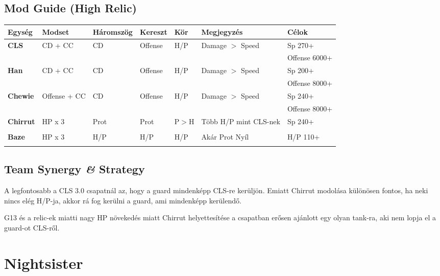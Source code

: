 \documentclass[11pt]{report}
\begin{document}
\section{Mod Guide (High Relic)}
\begin{center}
    \begin{tabular}{|l | l | l | l | l | l | l |}
        \hline
        Egység & Modset & Háromszög & Kereszt & Kör & Megjegyzés & Célok\\ \hline
        \textbf{CLS} & CD + CC & CD & Offense & H/P & Damage $>$ Speed & Sp 270+\\
        &  &  &  &  &  & Offense 6000+\\ \hline
        \textbf{Han} & CD + CC & CD & Offense & H/P & Damage $>$ Speed & Sp 200+\\
        &  &  &  &  &  & Offense 8000+\\ \hline
        \textbf{Chewie} & Offense + CC & CD & Offense & H/P & Damage $>$ Speed & Sp 240+\\ 
        &  &  &  &  &  & Offense 8000+\\ \hline
        \textbf{Chirrut} & HP x 3 & Prot & Prot & P$>$H & Több H/P mint CLS-nek & Sp 240+\\
        &  &  &  &  &  & \\ \hline
        \textbf{Baze} & HP x 3 & H/P & H/P & H/P & Akár Prot Nyíl & H/P 110+\\
        &  &  &  &  &  & \\ \hline
    \end{tabular}
\end{center}
\section{Team Synergy \textit{\&} Strategy}
A legfontosabb a CLS 3.0 csapatnál az, hogy a guard mindenképp CLS-re kerüljön. Emiatt Chirrut modolása különösen fontos, ha neki nincs elég H/P-ja, akkor rá fog kerülni a guard, ami mindenképp kerülendő.\par
G13 és a relic-ek miatti nagy HP növekedés miatt Chirrut helyettesítése a csapatban erősen ajánlott egy olyan tank-ra, aki nem lopja el a guard-ot CLS-ről.


\chapter{Nightsister}
\end{document}
